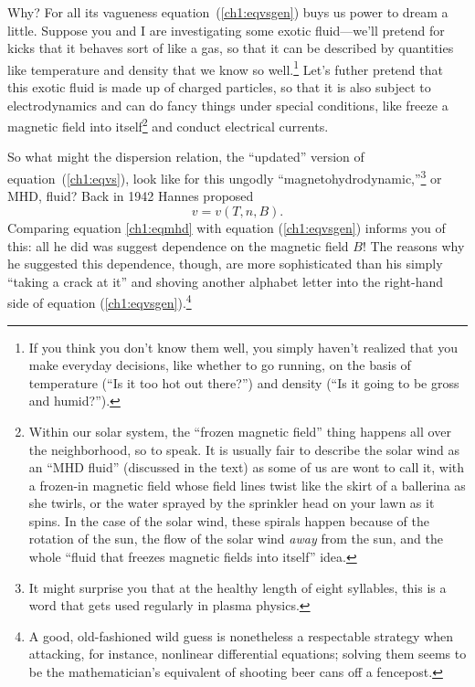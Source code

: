 Why? For all its vagueness equation~(\ref{ch1:eqvsgen}) buys us power
to dream a little. Suppose you and I are investigating some exotic
fluid---we'll pretend for kicks that it behaves sort of like a gas, so
that it can be described by quantities like temperature and density
that we know so well.\footnote{If you think you don't know them well,
  you simply haven't realized that you make everyday decisions, like
  whether to go running, on the basis of temperature (``Is it too hot
  out there?'') and density (``Is it going to be gross and humid?'').}
Let's futher pretend that this exotic fluid is made up of charged
particles, so that it is also subject to electrodynamics and can do
fancy things under special conditions, like freeze a magnetic field
into itself\footnote{Within our solar system, the ``frozen magnetic
  field'' thing happens all over the neighborhood, so to speak. It is
  usually fair to describe the solar wind as an ``MHD fluid''
  (discussed in the text) as some of us are wont to call it, with a
  frozen-in magnetic field whose field lines twist like the skirt of a
  ballerina as she twirls, or the water sprayed by the sprinkler head
  on your lawn as it spins. In the case of the solar wind, these
  spirals happen because of the rotation of the sun, the flow of the
  solar wind \emph{away} from the sun, and the whole ``fluid that
  freezes magnetic fields into itself'' idea.}  and conduct electrical
currents.

So what might the dispersion relation, the ``updated'' version of
equation~(\ref{ch1:eqvs}), look like for this ungodly
``magnetohydrodynamic,''\footnote{It might surprise you that at the
  healthy length of eight syllables, this is a word that gets used
  regularly in plasma physics.} or MHD, fluid? Back in 1942 Hannes
\Alf proposed
\begin{equation}
  \label{ch1:eqmhd}
  v = v ( T, n, B).
\end{equation}
Comparing equation \ref{ch1:eqmhd} with equation (\ref{ch1:eqvsgen})
informs you of this: all he did was suggest dependence on the magnetic
field $B$!  The reasons why he suggested this dependence, though, are
more sophisticated than his simply ``taking a crack at it'' and
shoving another alphabet letter into the right-hand side of equation
(\ref{ch1:eqvsgen}).\footnote{A good, old-fashioned wild guess is
  nonetheless a respectable strategy when attacking, for instance,
  nonlinear differential equations; solving them seems to be the
  mathematician's equivalent of shooting beer cans off a fencepost.}

